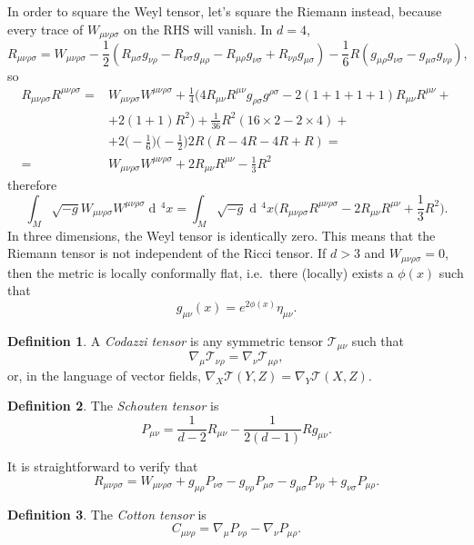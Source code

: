 \documentclass[a4paper,12pt]{book}
\newcommand{\dd}{\mathop{\mathrm{d}\!}{}}
\theoremstyle{definition}
\newtheorem{definition}{Definition}
\theoremstyle{remark}
\begin{document}
In order to square the Weyl tensor, let's square the Riemann instead, because every trace of $W_{\mu\nu\rho\sigma}$ on the RHS will vanish. In $d=4$,
\[R_{\mu\nu\rho\sigma}=W_{\mu\nu\rho\sigma}-\frac12(R_{\mu\sigma}g_{\nu\rho}-R_{\nu\sigma}g_{\mu\rho}-R_{\mu\rho}g_{\nu\sigma}+R_{\nu\rho}g_{\mu\sigma})-\frac16R(g_{\mu\rho}g_{\nu\sigma}-g_{\mu\sigma}g_{\nu\rho}),\]
so
\begin{align*}
R_{\mu\nu\rho\sigma}R^{\mu\nu\rho\sigma}={}&W_{\mu\nu\rho\sigma}W^{\mu\nu\rho\sigma}+\frac14\bigl(4R_{\mu\nu}R^{\mu\nu}g_{\rho\sigma}g^{\rho\sigma}-2(1+1+1+1)R_{\mu\nu}R^{\mu\nu}+{}\\
&+2(1+1)R^2\bigr)+\frac1{36}R^2(16\times 2-2\times 4)+{}\\
&+2\biggl(-\frac16\biggr)\biggl(-\frac12\biggr)2R(R-4R-4R+R)=\\
={}&W_{\mu\nu\rho\sigma}W^{\mu\nu\rho\sigma}+2R_{\mu\nu}R^{\mu\nu}-\frac13R^2
\end{align*}
therefore
\[\int_M\sqrt{-g}W_{\mu\nu\rho\sigma}W^{\mu\nu\rho\sigma}\dd^4x=\int_M\sqrt{-g}\dd^4x\biggl(R_{\mu\nu\rho\sigma}R^{\mu\nu\rho\sigma}-2R_{\mu\nu}R^{\mu\nu}+\frac13R^2\biggr).\]
In three dimensions, the Weyl tensor is identically zero. This means that the Riemann tensor is not independent of the Ricci tensor. If $d>3$ and $W_{\mu\nu\rho\sigma}=0$, then the metric is locally conformally flat, i.e.~there (locally) exists a $\phi(x)$ such that
\[g_{\mu\nu}(x)=e^{2\phi(x)}\eta_{\mu\nu}.\]

\begin{definition}
A \emph{Codazzi tensor} is any symmetric tensor $\mathcal T_{\mu\nu}$ such that
\[\nabla_\mu\mathcal T_{\nu\rho}=\nabla_\nu\mathcal T_{\mu\rho},\]
or, in the language of vector fields, $\nabla_X\mathcal T(Y,Z)=\nabla_Y\mathcal T(X,Z)$.
\end{definition}

\begin{definition}
The \emph{Schouten tensor} is
\[P_{\mu\nu}=\frac1{d-2}R_{\mu\nu}-\frac1{2(d-1)}Rg_{\mu\nu}.\]
\end{definition}

It is straightforward to verify that
\[R_{\mu\nu\rho\sigma}=W_{\mu\nu\rho\sigma}+g_{\mu\rho}P_{\nu\sigma}-g_{\nu\rho}P_{\mu\sigma}-g_{\mu\sigma}P_{\nu\rho}+g_{\nu\sigma}P_{\mu\rho}.\]

\begin{definition}
The \emph{Cotton tensor} is
\[C_{\mu\nu\rho}=\nabla_\mu P_{\nu\rho}-\nabla_\nu P_{\mu\rho}.\]
\end{definition}
\end{document}
